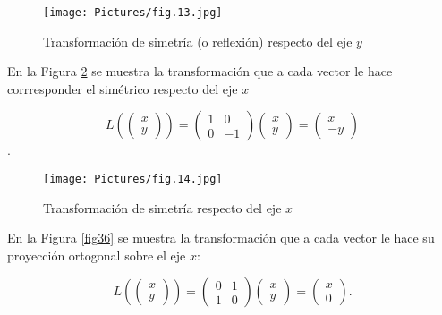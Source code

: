 \begin{figure}
    \centering
    \texttt{[image: Pictures/fig.13.jpg]}
    \caption{Transformación de simetría (o reflexión) respecto del eje $y$ }
    \label{TLfig50}
\end{figure}

\begin{example}
 En la Figura \ref{TLfig60} se muestra la transformación que a cada vector le hace corrresponder el simétrico respecto del eje $x$

 $$L  \left( \left(  \begin{array}{c} x  \\ y  \end{array}    \right) \right )= \left(   \begin{array}{cc} 1 & 0 \\ 0 & -1   \end{array} \right )\left( \begin{array}{c} x  \\ y  \end{array} \right )      =\left(   \begin{array}{c} x   \\ -y  \end{array} \right )$$ .
\end{example}

\begin{figure}
    \centering
    \texttt{[image: Pictures/fig.14.jpg]}
    \caption{Transformación de simetría respecto del eje $x$ }
    \label{TLfig60}
\end{figure}


\begin{example}
\label{proyejex}
 En la Figura \ref{fig36} se muestra la transformación que a cada vector le hace su proyección ortogonal sobre el eje $x$:

 $$L  \left( \left(  \begin{array}{c} x  \\ y  \end{array}    \right) \right )= \left(   \begin{array}{cc} 0 & 1 \\ 1 & 0   \end{array} \right ) \left( \begin{array}{c} x  \\ y  \end{array} \right )    =\left(   \begin{array}{c} x   \\ 0  \end{array} \right ).$$ 
\end{example}


